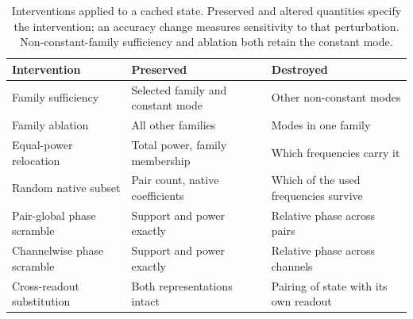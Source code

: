\begin{table}[t]
\centering\small
\setlength{\tabcolsep}{5pt}
\caption{Interventions applied to a cached state. Preserved and altered quantities specify the
intervention; an accuracy change measures sensitivity to that perturbation. Non-constant-family
sufficiency and ablation both retain the constant mode.}
\label{tab:interventions}
\begin{tabular}{lll}
\toprule
Intervention & Preserved & Destroyed \\
\midrule
Family sufficiency & Selected family and constant mode & Other non-constant modes \\
Family ablation & All other families & Modes in one family \\
Equal-power relocation & Total power, family membership & Which frequencies carry it \\
Random native subset & Pair count, native coefficients & Which of the used frequencies survive \\
Pair-global phase scramble & Support and power exactly & Relative phase across pairs \\
Channelwise phase scramble & Support and power exactly & Relative phase across channels \\
Cross-readout substitution & Both representations intact & Pairing of state with its own readout \\
\bottomrule
\end{tabular}
\end{table}
